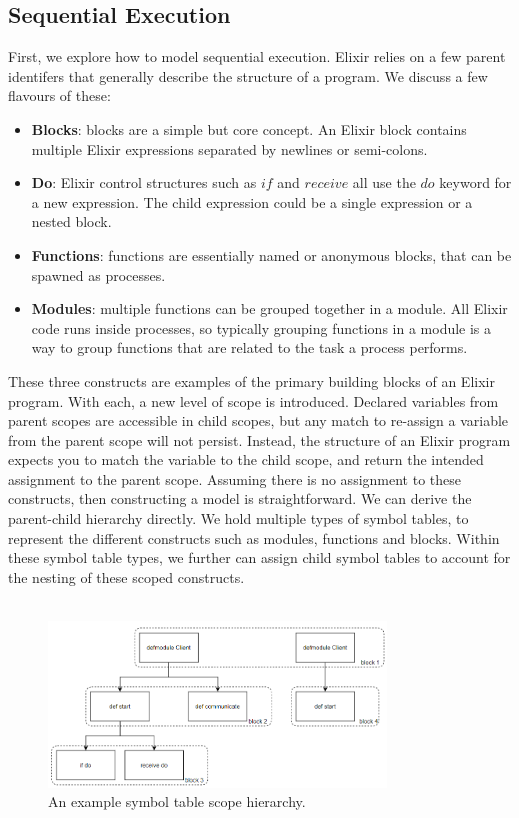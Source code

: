\subsection{Sequential Execution} \label{sec:sequential_execution}
First, we explore how to model sequential execution. Elixir relies on a few parent identifers that generally describe the structure of a program. We discuss a few flavours of these:
\begin{itemize}
    \item \textbf{Blocks}: blocks are a simple but core concept. An Elixir block contains multiple Elixir expressions separated by newlines or semi-colons.
    \item \textbf{Do}: Elixir control structures such as $if$ and $receive$ all use the $do$ keyword for a new expression. The child expression could be a single expression or a nested block.
    \item \textbf{Functions}: functions are essentially named or anonymous blocks, that can be spawned as processes.
    \item \textbf{Modules}: multiple functions can be grouped together in a module. All Elixir code runs inside processes, so typically grouping functions in a module is a way to group functions that are related to the task a process performs.
\end{itemize}
These three constructs are examples of the primary building blocks of an Elixir program. With each, a new level of scope is introduced. Declared variables from parent scopes are accessible in child scopes, but any match to re-assign a variable from the parent scope will not persist. Instead, the structure of an Elixir program expects you to match the variable to the child scope, and return the intended assignment to the parent scope. Assuming there is no assignment to these constructs, then constructing a model is straightforward. We can derive the parent-child hierarchy directly. We hold multiple types of symbol tables, to represent the different constructs such as modules, functions and blocks. Within these symbol table types, we further can assign child symbol tables to account for the nesting of these scoped constructs.
\\ \\
\begin{figure}[h]
    \centering
    \includegraphics[width=0.8\textwidth]{images/sym_Table.png}
    \caption{An example symbol table scope hierarchy.}
    \label{fig:scope_hierarchy}
\end{figure}
\\ \\
